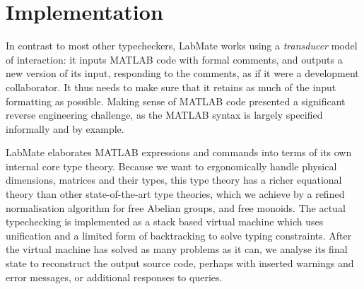 \documentclass{IMEKO2024}
\newcommand{\isadd}[1]{#1\ \textsf{numeric}}
\newcommand{\ismult}[3]{(#1, #2, #3)\ \textsf{multipliable}}
\newcommand{\Matrix}[5]{\mathsf{Matrix}\,#1\,#2\,#3\,#4\,#5}
\newcommand{\remph}{\emph}
\begin{document}
%
%

%
%



\section{Implementation}

In contrast to most other typecheckers, LabMate works using a
\remph{transducer} model of interaction: it inputs MATLAB code with
formal comments, and outputs a new version of its input, responding to
the comments, as if it were a development collaborator.  It thus needs
to make sure that it retains as much of the input formatting as
possible.  Making sense of MATLAB code presented a significant reverse
engineering challenge, as the MATLAB syntax is largely specified
informally and by example.

LabMate elaborates MATLAB expressions and commands into terms of its own internal core type theory.
%
Because we want to ergonomically handle physical dimensions, matrices
and their types, this type theory has a richer equational theory than
other state-of-the-art type theories, which we achieve by a refined
normalisation algorithm for free Abelian groups, and free monoids.
%
The actual typechecking is implemented as a stack based virtual machine which uses unification and a limited form of backtracking to solve typing constraints.
%
After the virtual machine has solved as many problems as it can, we analyse its final state to reconstruct the output source code, perhaps with inserted warnings and error messages, or additional responses to queries.
\end{document}

